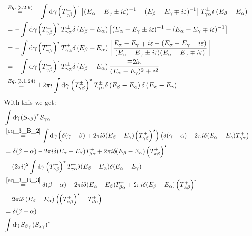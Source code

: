 \begin{widetext}
\begin{align}
		&\overset{Eq.\,({3.2.9})}{=}-\int\dd{\gamma}\left(T_{\gamma\beta}^\pm\right)^\star\left[(E_\alpha-E_\gamma\pm i \varepsilon)^{-1}-(E_\beta-E_\gamma\mp i \varepsilon)^{-1}\right]
		T_{\gamma\alpha}^\pm \delta\left(E_\beta-E_\alpha\right)\nonumber\\
		&=-\int\dd{\gamma}\left(T_{\gamma\beta}^\pm\right)^\star T_{\gamma\alpha}^\pm \delta\left(E_\beta-E_\alpha\right)
		\left[(E_\alpha-E_\gamma\pm i \varepsilon)^{-1}-(E_\alpha-E_\gamma\mp i \varepsilon)^{-1}\right]\nonumber\\
		&=-\int\dd{\gamma}\left(T_{\gamma\beta}^\pm\right)^\star T_{\gamma\alpha}^\pm \delta\left(E_\beta-E_\alpha\right)
		\left[\dfrac{E_\alpha-E_\gamma\mp i \varepsilon-(E_\alpha-E_\gamma\pm i \varepsilon)}{(E_\alpha-E_\gamma\pm i \varepsilon)(E_\alpha-E_\gamma\mp i \varepsilon)}\right]\nonumber\\
		&=-\int\dd{\gamma}\left(T_{\gamma\beta}^\pm\right)^\star T_{\gamma\alpha}^\pm \delta\left(E_\beta-E_\alpha\right)
		\dfrac{\mp 2i\varepsilon}{(E_\alpha-E_\gamma)^2+\varepsilon^2}\nonumber\\
		&\overset{Eq.\,({3.1.24})}{=}\pm 2\pi i\int\dd{\gamma}\left(T_{\gamma\beta}^\pm\right)^\star T_{\gamma\alpha}^\pm \delta\left(E_\beta-E_\alpha\right) \delta\left(E_\alpha-E_\gamma\right)
		\label{eq_3_B_3}
	\end{align}
	With this we get:
	\begin{align*}
		&\int\dd{\gamma}\left(S_{\gamma\beta}\right)^\star S_{\gamma\alpha}\\
		&\overset{\ref{eq_3_B_2}}{=}\int\dd{\gamma}\left(\delta(\gamma-\beta)+2 \pi i \delta(E_\beta-E_\gamma)\left(T_{\gamma\beta}^+\right)^\star\right)
		\left(\delta(\gamma-\alpha)-2 \pi i \delta(E_\alpha-E_\gamma)T_{\gamma\alpha}^+\right)\\
		&=\delta(\beta-\alpha)-2 \pi i \delta(E_\alpha-E_\beta)T_{\beta\alpha}^+
		+2 \pi i \delta(E_\beta-E_\alpha)\left(T_{\alpha\beta}^+\right)^\star\\
		&-(2\pi i)^2 \int\dd{\gamma} \left(T_{\gamma\beta}^+\right)^\star T_{\gamma\alpha}^+ \delta(E_\beta-E_\alpha)\delta(E_\alpha-E_\gamma)\\
		&\overset{\ref{eq_3_B_3}}{=}\delta(\beta-\alpha)-2 \pi i \delta(E_\alpha-E_\beta)T_{\beta\alpha}^+
		+2 \pi i \delta(E_\beta-E_\alpha)\left(T_{\alpha\beta}^+\right)^\star\\
		&-2\pi i \delta\left(E_\beta-E_\alpha\right)\left(\left(T_{\alpha\beta}^+\right)^\star-T_{\beta\alpha}^+\right)\\
		&=\delta(\beta-\alpha)\\
		&\int\dd{\gamma}S_{\beta\gamma}\left(S_{\alpha\gamma}\right)^\star 
	\end{align*}
\end{widetext}


